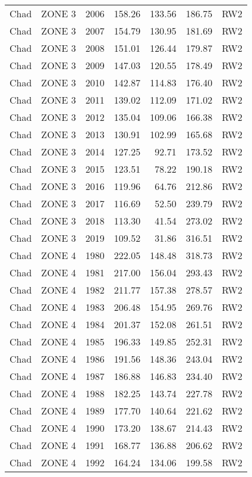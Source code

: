 \begin{longtable}{lllrrrl}
  Chad & ZONE 3 & 2006 & 158.26 & 133.56 & 186.75 & RW2 \\ 
  Chad & ZONE 3 & 2007 & 154.79 & 130.95 & 181.69 & RW2 \\ 
  Chad & ZONE 3 & 2008 & 151.01 & 126.44 & 179.87 & RW2 \\ 
  Chad & ZONE 3 & 2009 & 147.03 & 120.55 & 178.49 & RW2 \\ 
  Chad & ZONE 3 & 2010 & 142.87 & 114.83 & 176.40 & RW2 \\ 
  Chad & ZONE 3 & 2011 & 139.02 & 112.09 & 171.02 & RW2 \\ 
  Chad & ZONE 3 & 2012 & 135.04 & 109.06 & 166.38 & RW2 \\ 
  Chad & ZONE 3 & 2013 & 130.91 & 102.99 & 165.68 & RW2 \\ 
  Chad & ZONE 3 & 2014 & 127.25 & 92.71 & 173.52 & RW2 \\ 
  Chad & ZONE 3 & 2015 & 123.51 & 78.22 & 190.18 & RW2 \\ 
  Chad & ZONE 3 & 2016 & 119.96 & 64.76 & 212.86 & RW2 \\ 
  Chad & ZONE 3 & 2017 & 116.69 & 52.50 & 239.79 & RW2 \\ 
  Chad & ZONE 3 & 2018 & 113.30 & 41.54 & 273.02 & RW2 \\ 
  Chad & ZONE 3 & 2019 & 109.52 & 31.86 & 316.51 & RW2 \\ 
  Chad & ZONE 4 & 1980 & 222.05 & 148.48 & 318.73 & RW2 \\ 
  Chad & ZONE 4 & 1981 & 217.00 & 156.04 & 293.43 & RW2 \\ 
  Chad & ZONE 4 & 1982 & 211.77 & 157.38 & 278.57 & RW2 \\ 
  Chad & ZONE 4 & 1983 & 206.48 & 154.95 & 269.76 & RW2 \\ 
  Chad & ZONE 4 & 1984 & 201.37 & 152.08 & 261.51 & RW2 \\ 
  Chad & ZONE 4 & 1985 & 196.33 & 149.85 & 252.31 & RW2 \\ 
  Chad & ZONE 4 & 1986 & 191.56 & 148.36 & 243.04 & RW2 \\ 
  Chad & ZONE 4 & 1987 & 186.88 & 146.83 & 234.40 & RW2 \\ 
  Chad & ZONE 4 & 1988 & 182.25 & 143.74 & 227.78 & RW2 \\ 
  Chad & ZONE 4 & 1989 & 177.70 & 140.64 & 221.62 & RW2 \\ 
  Chad & ZONE 4 & 1990 & 173.20 & 138.67 & 214.43 & RW2 \\ 
  Chad & ZONE 4 & 1991 & 168.77 & 136.88 & 206.62 & RW2 \\ 
  Chad & ZONE 4 & 1992 & 164.24 & 134.06 & 199.58 & RW2 \\ 

\end{longtable}
